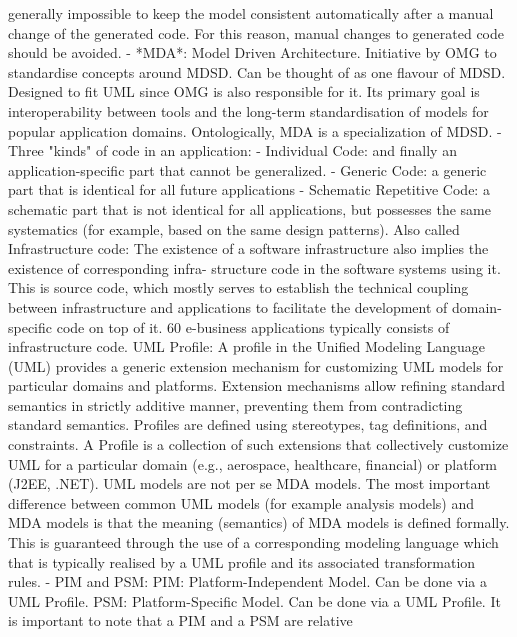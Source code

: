 \documentclass{book}
\begin{document}
  generally impossible to keep the model consistent automatically
  after a manual change of the generated code. For this reason, manual
  changes to generated code should be avoided.
- *MDA*: Model Driven Architecture. Initiative by OMG to standardise
  concepts around MDSD. Can be thought of as one flavour of
  MDSD. Designed to fit UML since OMG is also responsible for it. Its
  primary goal is interoperability between tools and the long-term
  standardisation of models for popular application
  domains. Ontologically, MDA is a specialization of MDSD.
- Three "kinds" of code in an application:
  - Individual Code: and finally an application-specific part that
    cannot be generalized.
  - Generic Code: a generic part that is identical for all future
    applications
  - Schematic Repetitive Code: a schematic part that is not identical
    for all applications, but possesses the same systematics (for
    example, based on the same design patterns). Also called
    Infrastructure code: The existence of a software infrastructure
    also implies the existence of corresponding infra- structure code
    in the software systems using it. This is source code, which
    mostly serves to establish the technical coupling between
    infrastructure and applications to facilitate the development of
    domain-specific code on top of it. 60%
    e-business applications typically consists of infrastructure code.
        UML Profile: A profile in the Unified Modeling Language (UML)
  provides a generic extension mechanism for customizing UML models
  for particular domains and platforms. Extension mechanisms allow
  refining standard semantics in strictly additive manner, preventing
  them from contradicting standard semantics. Profiles are defined
  using stereotypes, tag definitions, and constraints. A Profile is a
  collection of such extensions that collectively customize UML for a
  particular domain (e.g., aerospace, healthcare, financial) or
  platform (J2EE, .NET). UML models are not per se MDA models. The
  most important difference between common UML models (for example
  analysis models) and MDA models is that the meaning (semantics) of
  MDA models is defined formally. This is guaranteed through the use
  of a corresponding modeling language which that is typically
  realised by a UML profile and its associated transformation rules.
- PIM and PSM: PIM: Platform-Independent Model. Can be done via a UML
  Profile. PSM: Platform-Specific Model. Can be done via a UML
  Profile. It is important to note that a PIM and a PSM are relative
\end{document}
